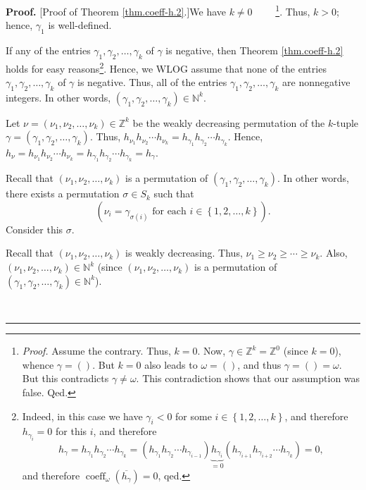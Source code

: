 \documentclass[numbers=enddot,12pt,final,onecolumn,notitlepage]{scrartcl}%
\theoremstyle{definition}
\newenvironment{proof}[1][Proof]{\noindent\textbf{#1.} }{\ \rule{0.5em}{0.5em}}
\begin{document}
\begin{proof}
[Proof of Theorem \ref{thm.coeff-h.2}.]We have $k\neq0$%
\ \ \ \ \footnote{\textit{Proof.} Assume the contrary. Thus, $k=0$. Now,
$\gamma\in\mathbb{Z}^{k}=\mathbb{Z}^{0}$ (since $k=0$), whence $\gamma=\left(
{}\right)  $. But $k=0$ also leads to $\omega=\left(  {}\right)  $, and thus
$\gamma=\left(  {}\right)  =\omega$. But this contradicts $\gamma\neq\omega$.
This contradiction shows that our assumption was false. Qed.}. Thus, $k>0$;
hence, $\gamma_{1}$ is well-defined.

If any of the entries $\gamma_{1},\gamma_{2},\ldots,\gamma_{k}$ of $\gamma$ is
negative, then Theorem \ref{thm.coeff-h.2} holds for easy
reasons\footnote{Indeed, in this case we have $\gamma_{i}<0$ for some
$i\in\left\{  1,2,\ldots,k\right\}  $, and therefore $h_{\gamma_{i}}=0$ for
this $i$, and therefore
\[
h_{\gamma}=h_{\gamma_{1}}h_{\gamma_{2}}\cdots h_{\gamma_{k}}=\left(
h_{\gamma_{1}}h_{\gamma_{2}}\cdots h_{\gamma_{i-1}}\right)
\underbrace{h_{\gamma_{i}}}_{=0}\left(  h_{\gamma_{i+1}}h_{\gamma_{i+2}}\cdots
h_{\gamma_{k}}\right)  =0,
\]
and therefore $\operatorname*{coeff}\nolimits_{\omega}\left(  \overline
{h_{\gamma}}\right)  =0$, qed.}. Hence, we WLOG assume that none of the
entries $\gamma_{1},\gamma_{2},\ldots,\gamma_{k}$ of $\gamma$ is negative.
Thus, all of the entries $\gamma_{1},\gamma_{2},\ldots,\gamma_{k}$ are
nonnegative integers. In other words, $\left(  \gamma_{1},\gamma_{2}%
,\ldots,\gamma_{k}\right)  \in\mathbb{N}^{k}$.

Let $\nu=\left(  \nu_{1},\nu_{2},\ldots,\nu_{k}\right)  \in\mathbb{Z}^{k}$ be
the weakly decreasing permutation of the $k$-tuple $\gamma=\left(  \gamma
_{1},\gamma_{2},\ldots,\gamma_{k}\right)  $. Thus, $h_{\nu_{1}}h_{\nu_{2}%
}\cdots h_{\nu_{k}}=h_{\gamma_{1}}h_{\gamma_{2}}\cdots h_{\gamma_{k}}$. Hence,
$h_{\nu}=h_{\nu_{1}}h_{\nu_{2}}\cdots h_{\nu_{k}}=h_{\gamma_{1}}h_{\gamma_{2}%
}\cdots h_{\gamma_{k}}=h_{\gamma}$.

Recall that $\left(  \nu_{1},\nu_{2},\ldots,\nu_{k}\right)  $ is a permutation
of $\left(  \gamma_{1},\gamma_{2},\ldots,\gamma_{k}\right)  $. In other words,
there exists a permutation $\sigma\in S_{k}$ such that
\begin{equation}
\left(  \nu_{i}=\gamma_{\sigma\left(  i\right)  }\text{ for each }i\in\left\{
1,2,\ldots,k\right\}  \right)  . \label{pf.lem.coeff-h.2.sig}%
\end{equation}
Consider this $\sigma$.

Recall that $\left(  \nu_{1},\nu_{2},\ldots,\nu_{k}\right)  $ is weakly
decreasing. Thus, $\nu_{1}\geq\nu_{2}\geq\cdots\geq\nu_{k}$. Also, $\left(
\nu_{1},\nu_{2},\ldots,\nu_{k}\right)  \in\mathbb{N}^{k}$ (since $\left(
\nu_{1},\nu_{2},\ldots,\nu_{k}\right)  $ is a permutation of $\left(
\gamma_{1},\gamma_{2},\ldots,\gamma_{k}\right)  \in\mathbb{N}^{k}$).


\end{proof}
\end{document}
